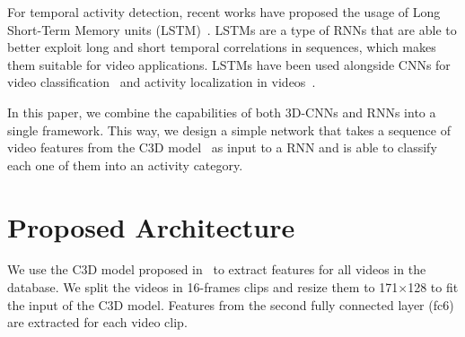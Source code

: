\documentclass{article}
\begin{document}
For temporal activity detection, recent works have proposed the usage of Long Short-Term Memory units (LSTM)~\cite{hochreiter1997long}.
LSTMs are a type of RNNs that are able to better exploit long and short temporal correlations in sequences, which makes them suitable for video applications.
LSTMs have been used alongside CNNs for video classification~\cite{yao2015describing} and activity localization in videos~\cite{yeung2015every}.

In this paper, we combine the capabilities of both 3D-CNNs and RNNs into a single framework. This way, we design a simple network that takes a sequence of video features from the C3D model~\cite{tran2014learning} as input to a RNN and is able to classify each one of them into an activity category.


\section{Proposed Architecture}



We use the C3D model proposed in~\cite{tran2014learning} to extract features for all videos in the database. We split the videos in 16-frames clips and resize them to 171$\times$128 to fit the input of the C3D model. Features from the second fully connected layer (fc6) are extracted for each video clip.

\end{document}
